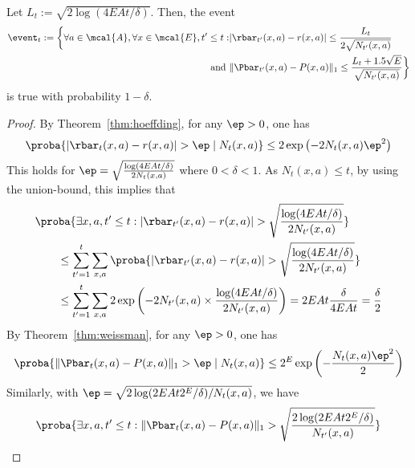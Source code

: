             \begin{lemma}
            \label{lem:high_prob_event}
                Let $L_t:=\sqrt{2\log(4EAt/\delta)}$. Then, the event
                \begin{align}
                \event_t:=\bigg\{\forall a\in\mcal{A}, \forall x\in\mcal{E}, t'\le t: &\vert\rbar_{t'}(x,a)-r(x,a)\vert\le \frac{L_t}{2\sqrt{N_{t'}(x,a)}}\\
                \text{ and } &\Vert\Pbar_{t'}(x,a)-P(x,a)\Vert_1\le \frac{L_t+1.5\sqrt{E}}{\sqrt{N_{t'}(x,a)}}\bigg\}
                \end{align}
                is true with probability $1-\delta$.
            \end{lemma}
            \begin{proof}
                By Theorem~\ref{thm:hoeffding}, for any $\ep>0$, one has
                \begin{align*}
                \proba{\vert\rbar_{t}(x,a)-r(x,a)\vert>\ep \mid N_{t}(x,a)} \le 2\exp\left(-2N_{t}(x,a)\ep^2\right)
                \end{align*}
                This holds for $\ep=\sqrt{\frac{\log(4EAt/\delta)}{2N_t(x,a)}}$ where $0<\delta<1$.
                As $N_t(x,a)\le t$, by using the union-bound, this implies that
                \begin{align}
                &\proba{\exists x,a, t'\le t: \vert\rbar_{t'}(x,a)-r(x,a)\vert>\sqrt{\frac{\log(4EAt/\delta)}{2N_{t'}(x,a)}}} \label{eq:conc_r}\\
                &\qquad \le \sum_{t'=1}^{t}\sum_{x,a} \proba{\vert\rbar_{t'}(x,a)-r(x,a)\vert>\sqrt{\frac{\log(4EAt/\delta)}{2N_{t'}(x,a)}}} \nonumber \\
                &\qquad \le \sum_{t'=1}^{t}\sum_{x,a} 2\exp\left(-2N_{t'}(x,a)\times\frac{\log(4EAt/\delta)}{2N_{t'}(x,a)}\right) =2EAt \frac{\delta}{4EAt}=\frac{\delta}2 \nonumber
                \end{align}
                By Theorem~\ref{thm:weissman}, for any $\ep>0$, one has
                \begin{align*}
                \proba{\Vert\Pbar_t(x,a)-P(x,a)\Vert_1 > \ep \mid N_t(x,a)} \le 2^E\exp\left(-\frac{N_t(x,a)\ep^2}{2}\right)
                \end{align*}
                Similarly, with $\ep=\sqrt{2\log(2EAt2^E/\delta)/N_t(x,a)}$, we have
                \begin{align*}
                &\proba{\exists x,a, t'\le t: \Vert\Pbar_t(x,a)-P(x,a)\Vert_1 >\sqrt{\frac{2\log(2EAt2^E/\delta)}{N_{t'}(x,a)}}} \\

\end{align*}
\end{proof}
